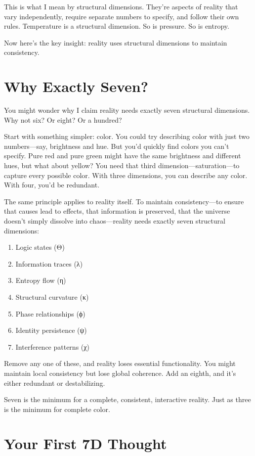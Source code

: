 This is what I mean by structural dimensions. They're aspects of reality that vary independently, require separate numbers to specify, and follow their own rules. Temperature is a structural dimension. So is pressure. So is entropy.

Now here's the key insight: reality uses structural dimensions to maintain consistency.

\section{Why Exactly Seven?}

You might wonder why I claim reality needs exactly seven structural dimensions. Why not six? Or eight? Or a hundred?

Start with something simpler: color. You could try describing color with just two numbers—say, brightness and hue. But you'd quickly find colors you can't specify. Pure red and pure green might have the same brightness and different hues, but what about yellow? You need that third dimension—saturation—to capture every possible color. With three dimensions, you can describe any color. With four, you'd be redundant.

The same principle applies to reality itself. To maintain consistency—to ensure that causes lead to effects, that information is preserved, that the universe doesn't simply dissolve into chaos—reality needs exactly seven structural dimensions:
\begin{enumerate}
\item Logic states (Θ)
\item Information traces (λ)
\item Entropy flow (η)
\item Structural curvature (κ)
\item Phase relationships (ϕ)
\item Identity persistence (ψ)
\item Interference patterns (χ)
\end{enumerate}

Remove any one of these, and reality loses essential functionality. You might maintain local consistency but lose global coherence. Add an eighth, and it's either redundant or destabilizing.

Seven is the minimum for a complete, consistent, interactive reality. Just as three is the minimum for complete color.

\section{Your First 7D Thought}

